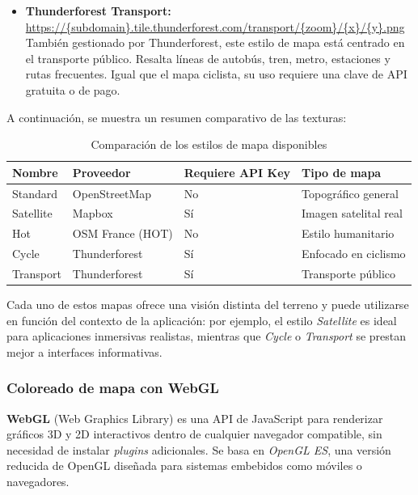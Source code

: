 \documentclass[a4paper, 12pt]{book}
\begin{document}
\begin{itemize}
    \item \textbf{Thunderforest Transport:} \\
    \url{https://\{subdomain\}.tile.thunderforest.com/transport/\{zoom\}/\{x\}/\{y\}.png} \\
    También gestionado por Thunderforest, este estilo de mapa está centrado en el transporte público. Resalta líneas de autobús, tren, metro, estaciones y rutas frecuentes. Igual que el mapa ciclista, su uso requiere una clave de API gratuita o de pago.

\end{itemize}

A continuación, se muestra un resumen comparativo de las texturas:

\begin{table}[H]
\centering
\begin{tabular}{|l|l|l|l|}
\hline
\textbf{Nombre} & \textbf{Proveedor} & \textbf{Requiere API Key} & \textbf{Tipo de mapa} \\
\hline
Standard & OpenStreetMap & No & Topográfico general \\
Satellite & Mapbox & Sí & Imagen satelital real \\
Hot & OSM France (HOT) & No & Estilo humanitario \\
Cycle & Thunderforest & Sí & Enfocado en ciclismo \\
Transport & Thunderforest & Sí & Transporte público \\
\hline
\end{tabular}
\caption{Comparación de los estilos de mapa disponibles}
\end{table}

Cada uno de estos mapas ofrece una visión distinta del terreno y puede utilizarse en función del contexto de la aplicación: por ejemplo, el estilo \textit{Satellite} es ideal para aplicaciones inmersivas realistas, mientras que \textit{Cycle} o \textit{Transport} se prestan mejor a interfaces informativas.

\subsubsection*{Coloreado de mapa con WebGL}

\textbf{WebGL} (Web Graphics Library) es una API de JavaScript para renderizar gráficos 3D y 2D interactivos dentro de cualquier navegador compatible, sin necesidad de instalar \textit{plugins} adicionales. Se basa en \textit{OpenGL ES}, una versión reducida de OpenGL diseñada para sistemas embebidos como móviles o navegadores.
\end{document}
